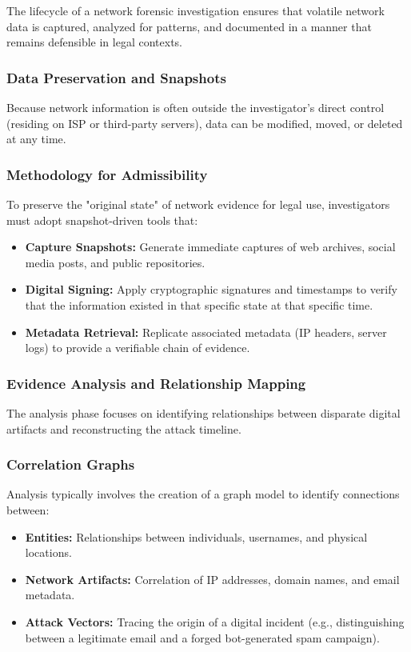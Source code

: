 The lifecycle of a network forensic investigation ensures that volatile network data is captured, analyzed for patterns, and documented in a manner that remains defensible in legal contexts.

\subsubsection{Data Preservation and Snapshots}
Because network information is often outside the investigator's direct control (residing on ISP or third-party servers), data can be modified, moved, or deleted at any time.

\subsubsection*{Methodology for Admissibility}
To preserve the "original state" of network evidence for legal use, investigators must adopt snapshot-driven tools that:
\begin{itemize}
    \item \textbf{Capture Snapshots:} Generate immediate captures of web archives, social media posts, and public repositories.
    \item \textbf{Digital Signing:} Apply cryptographic signatures and timestamps to verify that the information existed in that specific state at that specific time.
    \item \textbf{Metadata Retrieval:} Replicate associated metadata (IP headers, server logs) to provide a verifiable chain of evidence.
\end{itemize}

\subsubsection{Evidence Analysis and Relationship Mapping}
The analysis phase focuses on identifying relationships between disparate digital artifacts and reconstructing the attack timeline.

\subsubsection*{Correlation Graphs}
Analysis typically involves the creation of a graph model to identify connections between:
\begin{itemize}
    \item \textbf{Entities:} Relationships between individuals, usernames, and physical locations.
    \item \textbf{Network Artifacts:} Correlation of IP addresses, domain names, and email metadata.
    \item \textbf{Attack Vectors:} Tracing the origin of a digital incident (e.g., distinguishing between a legitimate email and a forged bot-generated spam campaign).
\end{itemize}

